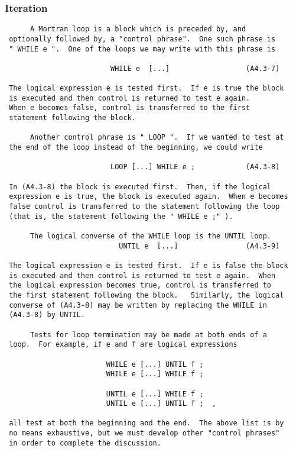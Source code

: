  \subsubsection{Iteration}
 \begin{verbatim}
      A Mortran loop is a block which is preceded by, and
 optionally followed by, a "control phrase".  One such phrase is
 " WHILE e ".  One of the loops we may write with this phrase is

                         WHILE e  [...]                  (A4.3-7)

 The logical expression e is tested first.  If e is true the block
 is executed and then control is returned to test e again.
 When e becomes false, control is transferred to the first
 statement following the block.

      Another control phrase is " LOOP ".  If we wanted to test at
 the end of the loop instead of the beginning, we could write

                         LOOP [...] WHILE e ;            (A4.3-8)

 In (A4.3-8) the block is executed first.  Then, if the logical
 expression e is true, the block is executed again.  When e becomes
 false control is transferred to the statement following the loop
 (that is, the statement following the " WHILE e ;" ).

      The logical converse of the WHILE loop is the UNTIL loop.
                           UNTIL e  [...]                (A4.3-9)

 The logical expression e is tested first.  If e is false the block
 is executed and then control is returned to test e again.  When
 the logical expression becomes true, control is transferred to
 the first statement following the block.   Similarly, the logical
 converse of (A4.3-8) may be written by replacing the WHILE in
 (A4.3-8) by UNTIL.

      Tests for loop termination may be made at both ends of a
 loop.  For example, if e and f are logical expressions

                        WHILE e [...] UNTIL f ;
                        WHILE e [...] WHILE f ;

                        UNTIL e [...] WHILE f ;
                        UNTIL e [...] UNTIL f ;  ,

 all test at both the beginning and the end.  The above list is by
 no means exhaustive, but we must develop other "control phrases"
 in order to complete the discussion.


\end{verbatim}
